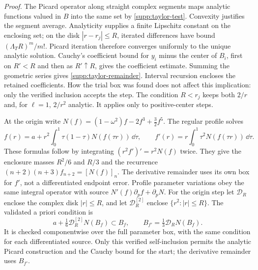 \noindent\emph{Proof.}
The Picard operator along straight complex segments maps analytic
functions valued in $B$ into the same set by \eqref{supp:taylor-test}.
Convexity justifies the segment average. Analyticity supplies a finite
Lipschitz constant on the enclosing set; on the disk $|r-r_j|\leq R$,
iterated differences have bound $(\Lambda_T R)^m/m!$. Picard iteration therefore converges
uniformly to the unique analytic solution. Cauchy's coefficient bound
for $y_i$ minus the center of $B_i$, first on $R'<R$ and then as
$R'\uparrow R$, gives the coefficient estimate. Summing the geometric
series gives \eqref{supp:taylor-remainder}. Interval recursion encloses
the retained coefficients. How the trial box was found does not affect
this implication: only the verified inclusion accepts the step.
The condition $R<r_j$ keeps both $2/r$ and, for $\ell=1$, $2/r^2$
analytic. It applies only to positive-center steps.

At the origin write $N(f)=(1-\omega^2)f-2f^3+\tfrac32f^5$. The
regular profile solves
\begin{equation}
 f(r)=a+r^2\int_0^1\tau(1-\tau)N(f(\tau r))\,\dd\tau,
 \qquad f'(r)=r\int_0^1\tau^2N(f(\tau r))\,\dd\tau.
\end{equation}
These formulas follow by integrating $(r^2f')'=r^2N(f)$ twice.
They give the enclosure masses $R^2/6$ and $R/3$ and the recurrence
$(n+2)(n+3)f_{n+2}=[N(f)]_n$. The derivative remainder uses its own
box for $f'$, not a differentiated endpoint error. Profile parameter
variations obey the same integral operator with source
$N'(f)\partial_pf+\partial_pN$.
For the origin step let $\mathcal D_R$ enclose the complex disk
$|r|\leq R$, and let $\mathcal D_R^{[2]}$ enclose
$\{r^2:|r|\leq R\}$. The validated a priori condition is
\begin{equation}
 a+\tfrac16\mathcal D_R^{[2]}N(B_f)\subset B_f,
 \qquad B_{f'}=\tfrac13\mathcal D_R N(B_f).
\end{equation}
It is checked componentwise over the full parameter box, with the same
condition for each differentiated source. Only this verified
self-inclusion permits the analytic Picard construction and the Cauchy
bound for the start; the derivative remainder uses $B_{f'}$.

